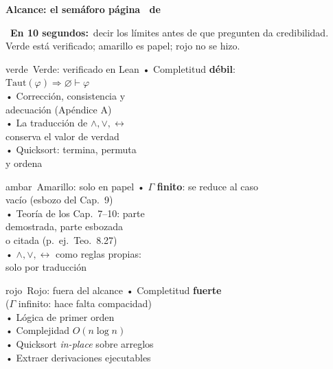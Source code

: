 \documentclass[12pt]{article}
\newcommand{\Taut}{\mathrm{Taut}}
\newcommand{\encabezado}[4]{%
  \begin{tcolorbox}[colback=#1, colframe=#1, arc=5pt, boxrule=0pt,
      left=10pt, right=10pt, top=5pt, bottom=5pt, after skip=4pt]
    \color{white}\LARGE #2\quad\bfseries #3\hfill
    \normalfont\large página \thepage\ de \pageref{LastPage}
  \end{tcolorbox}
  \begin{tcolorbox}[colback=tldr, colframe=#1, boxrule=0.8pt, arc=4pt,
      left=10pt, right=10pt, top=4pt, bottom=4pt, after skip=8pt]
    \large\faBolt\ \textbf{En 10 segundos:}\ #4
  \end{tcolorbox}}
\begin{document}
\newpage
\encabezado{alca}{\faTrafficLight}{Alcance: el semáforo}{decir los límites antes
de que pregunten da credibilidad. Verde está verificado; amarillo es papel; rojo
no se hizo.}

\begin{tcbraster}[raster columns=3, raster column skip=8pt, raster equal height]
\begin{tarjeta}{verde}{\faCheckCircle\ Verde: verificado en Lean}
\large
• Completitud \textbf{débil}:\\ \hphantom{• }$\Taut(\varphi)\Rightarrow\varnothing\vdash\varphi$\\[3pt]
• Corrección, consistencia y\\ \hphantom{• }adecuación (Apéndice A)\\[3pt]
• La traducción de $\wedge,\vee,\leftrightarrow$\\ \hphantom{• }conserva el valor de verdad\\[3pt]
• Quicksort: termina, permuta\\ \hphantom{• }y ordena
\end{tarjeta}
\begin{tarjeta}{ambar}{\faAdjust\ Amarillo: solo en papel}
\large
• $\Gamma$ \textbf{finito}: se reduce al caso\\ \hphantom{• }vacío (esbozo del Cap.\ 9)\\[3pt]
• Teoría de los Cap.\ 7–10: parte\\ \hphantom{• }demostrada, parte esbozada\\ \hphantom{• }o citada (p.\ ej.\ Teo.\ 8.27)\\[3pt]
• $\wedge,\vee,\leftrightarrow$ como reglas propias:\\ \hphantom{• }solo por traducción
\end{tarjeta}
\begin{tarjeta}{rojo}{\faTimesCircle\ Rojo: fuera del alcance}
\large
• Completitud \textbf{fuerte}\\ \hphantom{• }($\Gamma$ infinito: hace falta compacidad)\\[3pt]
• Lógica de primer orden\\[3pt]
• Complejidad $O(n\log n)$\\[3pt]
• Quicksort \emph{in-place} sobre arreglos\\[3pt]
• Extraer derivaciones ejecutables
\end{tarjeta}
\end{tcbraster}
\end{document}
